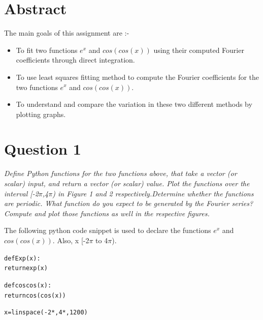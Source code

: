 \documentclass[11pt, a4paper]{article}
\title{\bold{\underline{\textit{\Large{Assignment 4: Fourier Approximations}}}}}
\author{ROHIT KUMAR [EE20B111]}
\date{\today}
\begin{document}
	
		
\maketitle 
\section*{Abstract}
The main goals of this assignment are :-
\begin{itemize}
\item To fit two functions $e^{x}$ and $cos(cos(x))$ using their computed Fourier coefficients through direct integration.
\item To use least squares fitting method to compute the Fourier coefficients for the two functions $e^{x}$ and $cos(cos(x))$.
\item To understand and compare the variation in these two different methods by plotting graphs.
\end{itemize}


\section{Question 1}
{\textsl{\small{Define Python functions for the two functions above, that take a vector (or scalar) input, and return a vector (or scalar) value. Plot the functions over the interval [-2$\pi$,4$\pi$) in Figure 1 and 2 respectively.Determine whether the functions are periodic.  What function do you expect to be generated by the Fourier series? Compute and plot those functions as well in the respective figures.}}}

The following python code snippet is used to declare the functions $e^{x}$ and $cos(cos(x))$. Also, x \in [-2$\pi$ to 4$\pi$).

\begin{alltt}
def Exp(x):              
    return exp(x)       

def coscos(x):           
    return cos(cos(x))

x = linspace(-2*\pi, 4*\pi, 1200)
\end{alltt}
\end{document}
